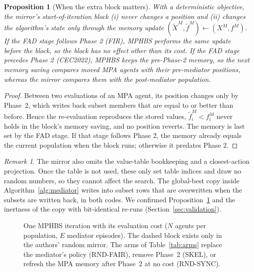 \documentclass[11pt]{article}
\newtheorem{proposition}{Proposition}
\theoremstyle{definition}
\theoremstyle{remark}
\newtheorem{remark}{Remark}
\begin{document}
\begin{proposition}[When the extra block matters]
\label{prop:memory}
With a deterministic objective, the mirror's start-of-iteration block (i) never changes a position and (ii) changes the
algorithm's state only through the memory update $(\tilde X^M,\tilde f^M)\gets(X^M,f^M)$. If the FAD stage follows
Phase 2 (FIR), MPHBS performs the same update before the block, so the block has no effect other than its cost. If the
FAD stage precedes Phase 2 (CEC2022), MPHBS keeps the pre-Phase-2 memory, so the next memory saving compares moved MPA
agents with their pre-mediator positions, whereas the mirror compares them with the post-mediator population.
\end{proposition}
\begin{proof}
Between two evaluations of an MPA agent, its position changes only by Phase~2, which writes back subset members that
are equal to or better than before. Hence the re-evaluation reproduces the stored values, $\tilde f^M_i<f^M_i$ never
holds in the block's memory saving, and no position reverts. The memory is last set by the FAD stage. If that stage
follows Phase 2, the memory already equals the current population when the block runs; otherwise it predates Phase 2.
\end{proof}

\begin{remark}
The mirror also omits the value-table bookkeeping and a closest-action projection. Once the table is not used, these
only set table indices and draw no random numbers, so they cannot affect the search. The global-best copy inside
Algorithm~\ref{alg:mediator} writes into subset rows that are overwritten when the subsets are written back, in both codes.
We confirmed Proposition~\ref{prop:memory} and the inertness of the copy with bit-identical re-runs
(Section~\ref{sec:validation}).
\end{remark}

\begin{figure}[t]
\centering
\resizebox{0.62\textwidth}{!}{}
\caption{One MPHBS iteration with its evaluation cost ($N$ agents per population, $E$ mediator episodes). The dashed block
exists only in the authors' random mirror. The arms of Table~\ref{tab:arms} replace the mediator's policy (RND-FAIR),
remove Phase~2 (SKEL), or refresh the MPA memory after Phase~2 at no cost (RND-SYNC).}
\label{fig:loop}
\end{figure}

\end{document}
